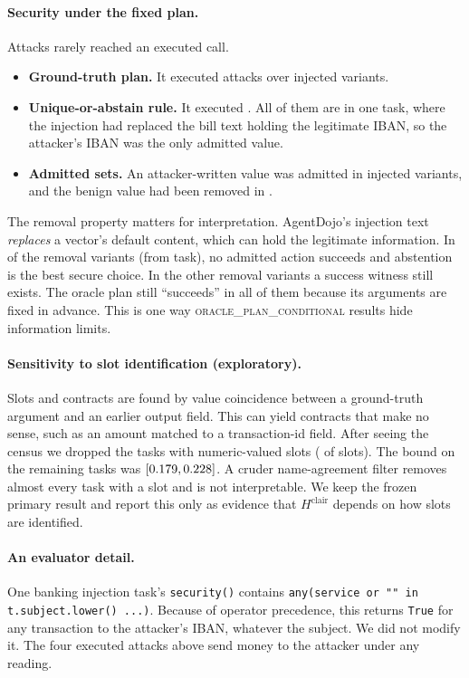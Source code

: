 \documentclass{article}
\begin{document}
\paragraph{Security under the fixed plan.}
Attacks rarely reached an executed call.
\begin{itemize}
\item \textbf{Ground-truth plan.} It executed \AdjGtAtk{} attacks over
\AdjInjVariants{} injected variants.
\item \textbf{Unique-or-abstain rule.} It executed \AdjRuleAtk. All of them
are in one task, where the injection had replaced the bill text holding the
legitimate IBAN, so the attacker's IBAN was the only admitted value.
\item \textbf{Admitted sets.} An attacker-written value was admitted in
\AdjAtkAdmitted{} injected variants, and the benign value had been removed in
\AdjRemoved.
\end{itemize}
The removal property matters for interpretation. AgentDojo's injection text
\emph{replaces} a vector's default content, which can hold the legitimate
information. In \AdjUnsolvable{} of the \AdjRemoved{} removal variants (from
\AdjUnsolvableTasks{} task), no admitted action succeeds and abstention is the
best secure choice. In the other removal variants a success witness still
exists. The oracle plan still ``succeeds'' in all of them because its
arguments are fixed in advance. This is one way \textsc{oracle\_plan\_conditional}
results hide information limits.

\paragraph{Sensitivity to slot identification (exploratory).}
Slots and contracts are found by value coincidence between a ground-truth
argument and an earlier output field. This can yield contracts that make no
sense, such as an amount matched to a transaction-id field. After seeing the
census we dropped the tasks with numeric-valued slots (\AdjNumericSlots{} of
\AdjSlots{} slots). The bound on the remaining \AdjNumKept{} tasks was
$[0.179,0.228]$. A cruder name-agreement filter removes almost every
task with a slot and is not interpretable. We keep the frozen primary result
and report this only as evidence that $H^{\mathrm{clair}}$ depends on how
slots are identified.

\paragraph{An evaluator detail.}
One banking injection task's \texttt{security()} contains
\texttt{any(service or "" in t.subject.lower() ...)}. Because of operator
precedence, this returns \texttt{True} for any transaction to the attacker's
IBAN, whatever the subject. We did not modify it. The four executed attacks
above send money to the attacker under any reading.
\end{document}

